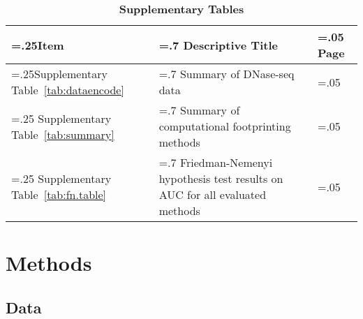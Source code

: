 \documentclass[11pt]{article}
\begin{document}
\begin{table*}[h!]
\small
\begin{flushleft}
\caption*{\textbf{{\small Supplementary Tables}}}
\vspace{-0.4cm}
\end{flushleft}
\begin{center}
\renewcommand{\arraystretch}{1.2}
\begin{tabularx}{\textwidth}{ |>{\hsize=.25\hsize}X|>{\hsize=.7\hsize}X|>{\hsize=.05\hsize}X| }
\hline
\textbf{Item} & \textbf{Descriptive Title} & \textbf{Page} \\
\hline
Supplementary Table~\ref{tab:dataencode} & Summary of DNase-seq data & \pageref{tab:dataencode} \\
\hline
Supplementary Table~\ref{tab:summary} & Summary of computational footprinting methods & \pageref{tab:summary} \\
\hline
Supplementary Table~\ref{tab:fn.table} & Friedman-Nemenyi hypothesis test results on AUC for all evaluated methods & \pageref{tab:fn.table} \\
\hline
\end{tabularx}
\end{center}
\end{table*}

\clearpage

\section{Methods}
\label{sec:methods}

\subsection{Data}
\label{sec:data}
\end{document}
